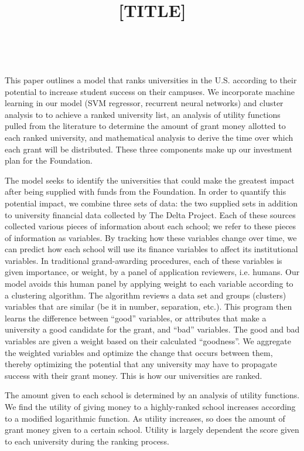 \documentclass[11pt, reqno]{amsart}
\title{[TITLE]}
\begin{document}
	\nocite{*}
	\thispagestyle{empty}
	
	\ \vspace{8.6cm}
	
		This paper outlines a model that ranks universities in the U.S. according to their potential to increase student success on their campuses. We incorporate machine learning in our model (SVM regressor, recurrent neural networks) and cluster analysis to to achieve a ranked university list, an analysis of utility functions pulled from the literature to determine the amount of grant money allotted to each ranked university, and mathematical analysis to derive the time over which each grant will be distributed. These three components make up our investment plan for the Foundation.
		
		The model seeks to identify the universities that could make the greatest impact after being supplied with funds from the Foundation. In order to quantify this potential impact, we combine three sets of data: the two supplied sets in addition to university financial data collected by The Delta Project. Each of these sources collected various pieces of information about each school; we refer to these pieces of information as variables. By tracking how these variables change over time, we can predict how each school will use its finance variables to affect its institutional variables. In traditional grand-awarding procedures, each of these variables is given importance, or weight, by a panel of application reviewers, i.e. humans. Our model avoids this human panel by applying weight to each variable according to a clustering algorithm. The algorithm reviews a data set and groups (clusters) variables that are similar (be it in number, separation, etc.). This program then learns the difference between ``good'' variables, or attributes that make a university a good candidate for the grant, and ``bad'' variables. The good and bad variables are given a weight based on their calculated ``goodness''. We aggregate the weighted variables and optimize the change that occurs between them, thereby optimizing the potential that any university may have to propagate success with their grant money. This is how our universities are ranked.
		     
		The amount given to each school is determined by an analysis of utility functions. We find the utility of giving money to a highly-ranked school increases according to a modified logarithmic function. As utility increases, so does the amount of grant money given to a certain school. Utility is largely dependent the score given to each university during the ranking process. 
		     
\end{document}
